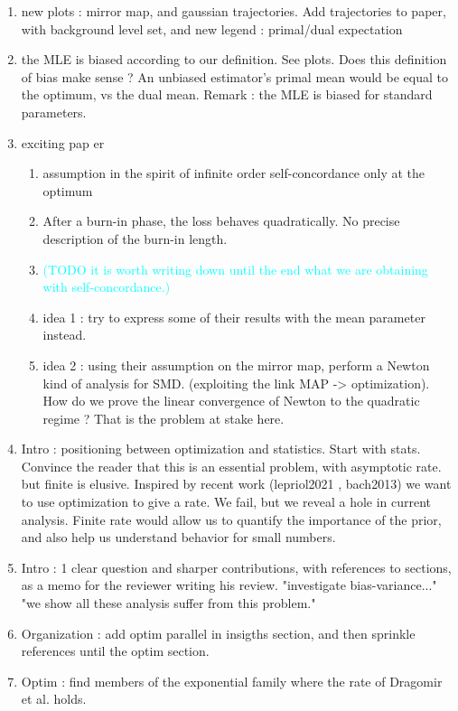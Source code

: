 \documentclass[twoside]{article}
\newcommand{\TODO}[1]{\textcolor{cyan}{(TODO #1)}}
\begin{document}
\begin{enumerate}
	\item new plots : mirror map, and gaussian trajectories. Add trajectories to paper, with background level set, and new legend : primal/dual expectation
	\item the MLE is biased according to our definition. See plots. Does this definition of bias make sense ? An unbiased estimator's primal mean would be equal to the optimum, vs the dual mean.  Remark : the MLE is biased for standard parameters.
	\item exciting pap er\citet{kakade2010learning}
	\begin{enumerate}
		\item assumption in the spirit of infinite order self-concordance only at the optimum
		\item After a burn-in phase, the loss behaves quadratically. No precise description of the burn-in length.
		\item \TODO{it is worth writing down until the end what we are obtaining with self-concordance.}
		\item idea 1 : try to express some of their results with the mean parameter instead.
		\item idea 2 : using their assumption on the mirror map, perform a Newton kind of analysis for SMD. (exploiting the link MAP -> optimization). How do we prove the linear convergence of Newton to the quadratic regime ? That is the problem at stake here.
	\end{enumerate}
	\item Intro : positioning between optimization and statistics. Start with stats. Convince the reader that this is an essential problem, with asymptotic rate. but finite is elusive. Inspired by recent work (lepriol2021 , bach2013) we want to use optimization to give a rate. We fail, but we reveal a hole in current analysis.  Finite rate would allow us to quantify the importance of the prior, and also help us understand behavior for small numbers.
	\item Intro : 1 clear question and sharper contributions, with references to sections, as a memo for the reviewer writing his review. "investigate bias-variance..." "we show all these analysis suffer from this problem."
	\item Organization : add optim parallel in insigths section, and then sprinkle references until the optim section.
	\item Optim : find members of the exponential family where the rate of Dragomir et al. holds.

\end{enumerate}
\end{document}

